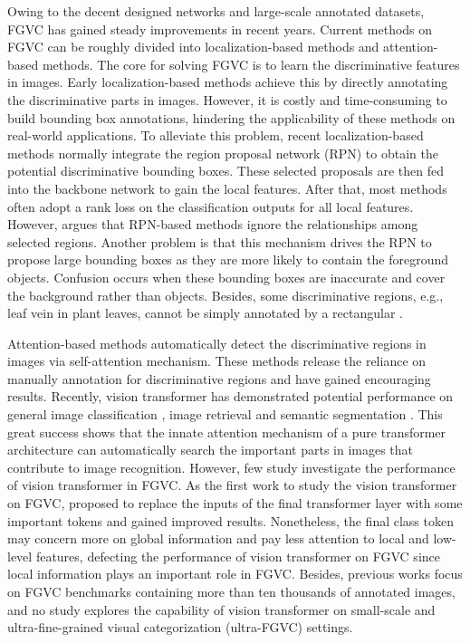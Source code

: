 \documentclass{bmvc2k}
\begin{document}
Owing to the decent designed networks and large-scale annotated datasets, FGVC has gained steady improvements in recent years. Current methods on FGVC can be roughly divided into localization-based methods and attention-based methods. The core for solving FGVC is to learn the discriminative features in images. Early localization-based methods \cite{huang2016part,berg2013poof,xie2013hierarchical} achieve this by directly annotating the discriminative parts in images. However, it is costly and time-consuming to build bounding box annotations, hindering the applicability of these methods on real-world applications. To alleviate this problem, recent localization-based methods normally integrate the region proposal network (RPN) to obtain the potential discriminative bounding boxes. These selected proposals are then fed into the backbone network to gain the local features. After that, most methods often adopt a rank loss \cite{chen2009ranking} on  the classification outputs for all local features. However, \cite{he2021transfg} argues that RPN-based methods ignore the relationships among selected regions. Another problem is that this mechanism drives the RPN to propose large bounding boxes as they are more likely to contain the foreground objects. Confusion occurs when these bounding boxes are inaccurate and cover the background rather than objects. Besides, some discriminative regions, e.g., leaf vein in plant leaves, cannot be simply annotated by a rectangular \cite{9506424}.
\par
Attention-based \cite{zhao2017diversified, xiao2015application, zheng2021rethinking} methods automatically detect the discriminative regions in images via self-attention mechanism. These methods release the reliance on manually annotation for discriminative regions and have gained encouraging results. Recently, vision transformer has demonstrated potential performance on general image classification \cite{dosovitskiy2020image}, image retrieval \cite{el2021training} and semantic segmentation \cite{zheng2021rethinking}. This great success shows that the innate attention mechanism of a pure transformer architecture can automatically search the important parts in images that contribute to image recognition. However, few study investigate the performance of vision transformer in FGVC. As the first work to study the vision transformer on FGVC, \cite{he2021transfg} proposed to replace the inputs of the final transformer layer with some important tokens and gained improved results. Nonetheless, the final class token may concern more on global information and pay less attention to local and low-level features, defecting the performance of vision transformer on FGVC since local information plays an important role in FGVC. Besides, previous works focus on FGVC benchmarks containing more than ten thousands of annotated images, and no study explores the capability of vision transformer on small-scale and ultra-fine-grained visual categorization (ultra-FGVC) settings.
\end{document}
